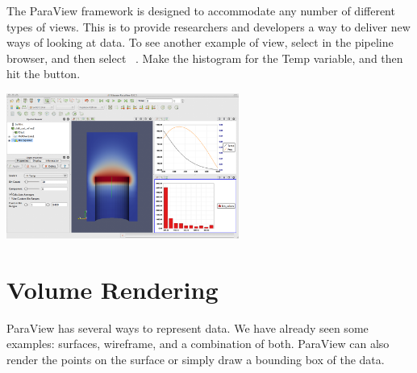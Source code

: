 The ParaView framework is designed to accommodate any number of different
types of views.  This is to provide researchers and developers a way to
deliver new ways of looking at data.  To see another example of view,
select  in the pipeline browser, and then select
 \ra {} \ra
{}~.  Make the histogram
for the Temp variable, and then hit the \apply button.

\begin{inlinefig}
  \includegraphics[width=3in]{images/HistogramPlot}
\end{inlinefig}


\section{Volume Rendering}

ParaView has several ways to represent data.  We have already seen some
examples: surfaces, wireframe, and a combination of both.  ParaView can
also render the points on the surface or simply draw a bounding box of the
data.

